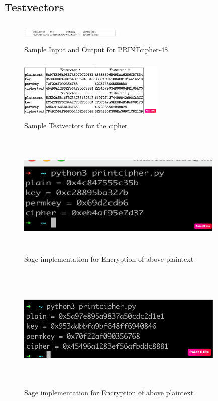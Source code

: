 \documentclass[journal=tosc,preprint]{iacrtrans}
\begin{document}
\subsection{Testvectors}
\begin{figure}[ht]
	\centering
	\includegraphics[height=1cm, width=5cm]{pics/testvector1.png}
	\caption{Sample Input and Output for PRINTcipher-48}
\end{figure}
\begin{figure}[ht]
	\centering
	\includegraphics[height=3cm, width=7cm]{pics/testvector-2.png}
	\caption{Sample Testvectors for the cipher}
\end{figure}
\begin{figure}[ht]
	\centering
	\includegraphics[height=6cm, width=10cm]{pics/pic_1.png}
	\caption{Sage implementation for Encryption of above plaintext}
\end{figure}
\begin{figure}[ht]
	\centering
	\includegraphics[height=6cm, width=10cm]{pics/pic_2.png}
	\caption{Sage implementation for Encryption of above plaintext}
\end{figure}
\end{document}
